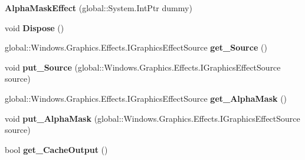 \begin{DoxyCompactItemize}
{\bfseries Alpha\+Mask\+Effect} (global\+::\+System.\+Int\+Ptr dummy)
\item 
\mbox{\label{class_microsoft_1_1_graphics_1_1_canvas_1_1_effects_1_1_alpha_mask_effect_ad440adc90c2c781ab55ade969e5f1d4e}} 
void {\bfseries Dispose} ()
\item 
\mbox{\label{class_microsoft_1_1_graphics_1_1_canvas_1_1_effects_1_1_alpha_mask_effect_a8d116ff3511cd0f94376c742892e704d}} 
global\+::\+Windows.\+Graphics.\+Effects.\+I\+Graphics\+Effect\+Source {\bfseries get\+\_\+\+Source} ()
\item 
\mbox{\label{class_microsoft_1_1_graphics_1_1_canvas_1_1_effects_1_1_alpha_mask_effect_abf6bc1fce01955fd8230cfbdbc60dfb5}} 
void {\bfseries put\+\_\+\+Source} (global\+::\+Windows.\+Graphics.\+Effects.\+I\+Graphics\+Effect\+Source source)
\item 
\mbox{\label{class_microsoft_1_1_graphics_1_1_canvas_1_1_effects_1_1_alpha_mask_effect_a792ae5ec633c37855297ce56bca05ca7}} 
global\+::\+Windows.\+Graphics.\+Effects.\+I\+Graphics\+Effect\+Source {\bfseries get\+\_\+\+Alpha\+Mask} ()
\item 
\mbox{\label{class_microsoft_1_1_graphics_1_1_canvas_1_1_effects_1_1_alpha_mask_effect_afd9b551a7df57ac4fc9bfb2273852158}} 
void {\bfseries put\+\_\+\+Alpha\+Mask} (global\+::\+Windows.\+Graphics.\+Effects.\+I\+Graphics\+Effect\+Source source)
\item 
\mbox{\label{class_microsoft_1_1_graphics_1_1_canvas_1_1_effects_1_1_alpha_mask_effect_a1a8a0b71bf38b0ea9c0cf7aed0b847af}} 
bool {\bfseries get\+\_\+\+Cache\+Output} ()
\item 
\mbox{\label{class_microsoft_1_1_graphics_1_1_canvas_1_1_effects_1_1_alpha_mask_effect_afd836c4380d7c17db8f813b285bc0d7c}} 

\end{DoxyCompactItemize}

